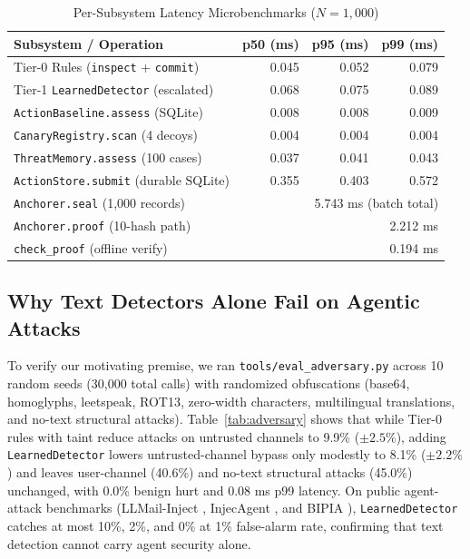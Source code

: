 \documentclass[conference]{IEEEtran}
\begin{document}
\begin{table}[t]
\centering
\caption{Per-Subsystem Latency Microbenchmarks ($N=1,000$)}
\label{tab:latency}
\begin{tabular}{lrrr}
\toprule
\textbf{Subsystem / Operation} & \textbf{p50 (ms)} & \textbf{p95 (ms)} & \textbf{p99 (ms)} \\
\midrule
Tier-0 Rules (\texttt{inspect} + \texttt{commit}) & 0.045 & 0.052 & 0.079 \\
Tier-1 \texttt{LearnedDetector} (escalated) & 0.068 & 0.075 & 0.089 \\
\texttt{ActionBaseline.assess} (SQLite) & 0.008 & 0.008 & 0.009 \\
\texttt{CanaryRegistry.scan} (4 decoys) & 0.004 & 0.004 & 0.004 \\
\texttt{ThreatMemory.assess} (100 cases) & 0.037 & 0.041 & 0.043 \\
\texttt{ActionStore.submit} (durable SQLite) & 0.355 & 0.403 & 0.572 \\
\midrule
\texttt{Anchorer.seal} (1,000 records) & \multicolumn{3}{r}{5.743 ms (batch total)} \\
\texttt{Anchorer.proof} (10-hash path) & \multicolumn{3}{r}{2.212 ms} \\
\texttt{check\_proof} (offline verify) & \multicolumn{3}{r}{0.194 ms} \\
\bottomrule
\end{tabular}
\end{table}

\subsection{Why Text Detectors Alone Fail on Agentic Attacks}
To verify our motivating premise, we ran \texttt{tools/eval\_adversary.py} across 10 random seeds (30,000 total calls) with randomized obfuscations (base64, homoglyphs, leetspeak, ROT13, zero-width characters, multilingual translations, and no-text structural attacks). Table~\ref{tab:adversary} shows that while Tier-0 rules with taint reduce attacks on untrusted channels to 9.9\% ($\pm 2.5\%$), adding \texttt{LearnedDetector} lowers untrusted-channel bypass only modestly to 8.1\% ($\pm 2.2\%$) and leaves user-channel (40.6\%) and no-text structural attacks (45.0\%) unchanged, with 0.0\% benign hurt and 0.08 ms p99 latency. On public agent-attack benchmarks (LLMail-Inject \cite{abdelnabi2025llmail}, InjecAgent \cite{zhan2024injecagent}, and BIPIA \cite{yi2023bipia}), \texttt{LearnedDetector} catches at most 10\%, 2\%, and 0\% at 1\% false-alarm rate, confirming that text detection cannot carry agent security alone.
\end{document}
